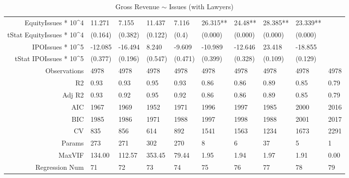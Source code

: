 \begin{table}[ht]
\begin{tabular}{rlllllllll}
  EquityIssues * 10^4 & 11.271 & 7.155 & 11.437 & 7.116 & 26.315** & 24.48** & 28.385** & 23.339** &  \\ 
  tStat EquityIssues * 10^4 & (0.164) & (0.382) & (0.122) & (0.4) & (0.000) & (0.000) & (0.000) & (0.000) &  \\ 
  IPOIssues * 10^5 & -12.085 & -16.494 & 8.240 & -9.609 & -10.989 & -12.646 & 23.418 & -18.855 &  \\ 
  tStat IPOIssues * 10^5 & (0.377) & (0.196) & (0.547) & (0.471) & (0.399) & (0.328) & (0.109) & (0.129) &  \\ 
  Observations & 4978 & 4978 & 4978 & 4978 & 4978 & 4978 & 4978 & 4978 & 4978 \\ 
  R2 & 0.93 & 0.93 & 0.95 & 0.93 & 0.86 & 0.86 & 0.89 & 0.85 & 0.79 \\ 
  Adj R2 & 0.93 & 0.92 & 0.95 & 0.92 & 0.86 & 0.86 & 0.89 & 0.85 & 0.79 \\ 
  AIC & 1967 & 1969 & 1952 & 1971 & 1996 & 1997 & 1985 & 2000 & 2016 \\ 
  BIC & 1985 & 1986 & 1971 & 1988 & 1997 & 1998 & 1988 & 2001 & 2017 \\ 
  CV & 835 & 856 & 614 & 892 & 1541 & 1563 & 1234 & 1673 & 2291 \\ 
  Params & 273 & 271 & 302 & 270 & 8 & 6 & 37 & 5 & 1 \\ 
  MaxVIF & 134.00 & 112.57 & 353.45 & 79.44 & 1.95 & 1.94 & 1.97 & 1.91 & 0.00 \\ 
  Regression Num & 71 & 72 & 73 & 74 & 75 & 76 & 77 & 78 & 79 \\ 
   \hline
\end{tabular}
\caption{Gross Revenue $\sim$ Issues (with Lawyers)} 
\end{table}
